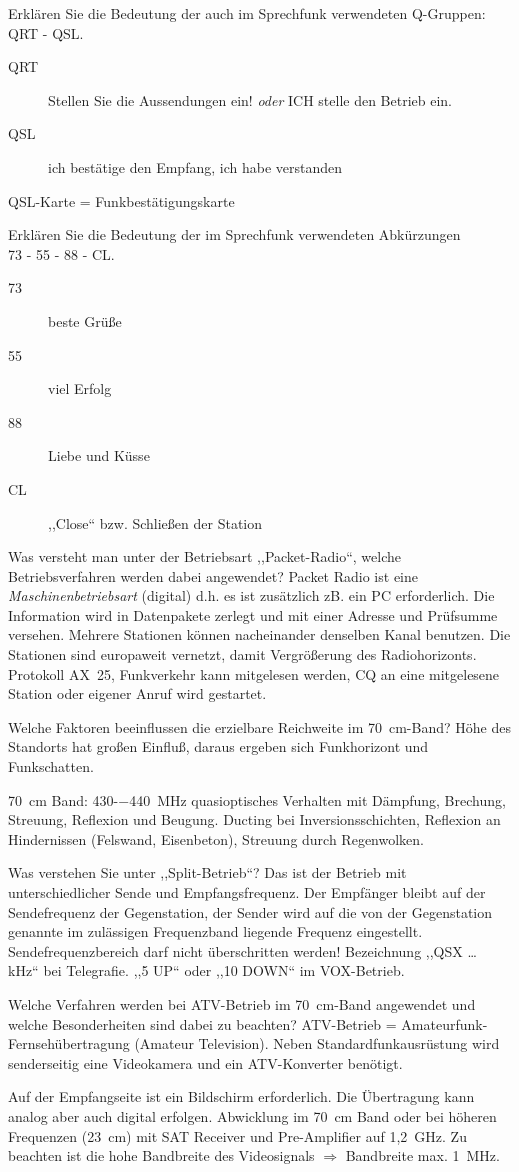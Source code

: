 \documentclass[avery5371,grid,frame,a4paper]{flashcards}
\newcommand{\card}[3]{
  \begin{flashcard}[{\chap} -- #1]{#2}#3\end{flashcard}
}
\begin{document}
\card{29}{Erklären Sie die Bedeutung der auch im Sprechfunk verwendeten Q-Gruppen: QRT - QSL.}{
  \begin{description}
    \item[QRT] Stellen Sie die Aussendungen ein! \textit{oder} ICH stelle den Betrieb ein.
    \item[QSL] ich bestätige den Empfang, ich habe verstanden
  \end{description}
  QSL-Karte = Funkbestätigungskarte
}
\card{30}{Erklären Sie die Bedeutung der im Sprechfunk verwendeten Abkürzungen \\ 73 - 55 - 88 - CL.}{
  \begin{description}
    \item[73] beste Grüße
    \item[55] viel Erfolg
    \item[88] Liebe und Küsse
    \item[CL] ,,Close`` bzw. Schließen der Station
  \end{description}
}
\card{31}{Was versteht man unter der Betriebsart ,,Packet-Radio``, welche Betriebsverfahren werden dabei angewendet?}{
  Packet Radio ist eine \emph{Maschinenbetriebsart} (digital) d.h. es ist zusätzlich zB. ein PC erforderlich. Die Information wird in Datenpakete zerlegt und mit einer Adresse und Prüfsumme versehen. Mehrere Stationen können nacheinander denselben Kanal benutzen. Die Stationen sind europaweit vernetzt, damit Vergrößerung des Radiohorizonts. Protokoll AX~25, Funkverkehr kann mitgelesen werden, CQ an eine mitgelesene Station oder eigener Anruf wird gestartet.
}
\card{32}{Welche Faktoren beeinflussen die erzielbare Reichweite im \SI{70}{\centi\metre}-Band?}{
  Höhe des Standorts hat großen Einfluß, daraus ergeben sich Funkhorizont und Funkschatten.

  \SI{70}{\centi\metre} Band: 430-\SI{-440}{\mega\Hz} quasioptisches Verhalten mit Dämpfung, Brechung, Streuung, Reflexion und Beugung. Ducting bei Inversionsschichten, Reflexion an Hindernissen (Felswand, Eisenbeton), Streuung durch Regenwolken.
}
\card{33}{Was verstehen Sie unter ,,Split-Betrieb``?}{
  Das ist der Betrieb mit unterschiedlicher Sende und Empfangsfrequenz. Der Empfänger bleibt auf der Sendefrequenz der Gegenstation, der Sender wird auf die von der Gegenstation genannte im zulässigen Frequenzband liegende Frequenz eingestellt. Sendefrequenzbereich darf nicht überschritten werden! Bezeichnung ,,QSX \dots{} kHz`` bei Telegrafie. ,,5 UP`` oder ,,10 DOWN`` im VOX-Betrieb.
}
\card{34}{Welche Verfahren werden bei ATV-Betrieb im \SI{70}{\centi\metre}-Band angewendet und welche Besonderheiten sind dabei zu beachten?}{
  ATV-Betrieb = Amateurfunk-Fernsehübertragung (Amateur Television). Neben Standardfunkausrüstung wird senderseitig eine Videokamera und ein ATV-Konverter benötigt.

  Auf der Empfangseite ist ein Bildschirm erforderlich. Die Übertragung kann analog aber auch digital erfolgen. Abwicklung im \SI{70}{\centi\metre} Band oder bei höheren Frequenzen (\SI{23}{\centi\metre}) mit SAT Receiver und Pre-Amplifier auf 1,2~GHz. Zu beachten ist die hohe Bandbreite des Videosignals $\Rightarrow$ Bandbreite max. 1~MHz.
}
\end{document}
